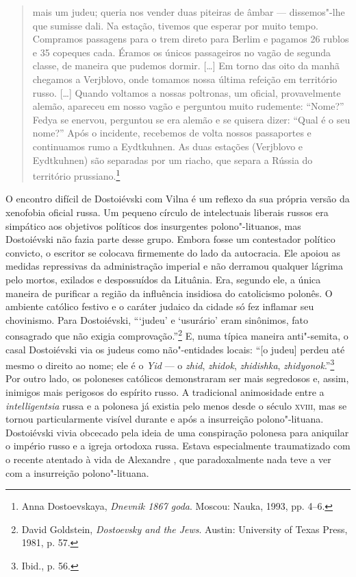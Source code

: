\begin{quote}
mais um judeu; queria nos vender duas piteiras de âmbar --- dissemos"-lhe
que sumisse dali. Na estação, tivemos que esperar por muito tempo.
Compramos passagens para o trem direto para Berlim e pagamos 26 rublos e
35 copeques cada. Éramos os únicos passageiros no vagão de segunda
classe, de maneira que pudemos dormir. [\ldots{}] Em torno das oito da
manhã chegamos a Verjblovo, onde tomamos nossa última refeição em
território russo. [\ldots{}] Quando voltamos a nossas poltronas, um
oficial, provavelmente alemão, apareceu em nosso vagão e perguntou muito
rudemente: ``Nome?'' Fedya se enervou, perguntou se era alemão e se
quisera dizer: ``Qual é o seu nome?'' Após o incidente, recebemos de
volta nossos passaportes e continuamos rumo a Eydtkuhnen. As duas
estações (Verjblovo e Eydtkuhnen) são separadas por um riacho, que
separa a Rússia do território prussiano.\footnote{Anna Dostoevskaya, \textit{Dnevnik 1867 goda}. Moscou: Nauka, 1993, pp. 4--6.} \end{quote}

O encontro difícil de Dostoiévski com Vilna é um reflexo da sua própria
versão da xenofobia oficial russa. Um pequeno círculo de intelectuais
liberais russos era simpático aos objetivos políticos dos insurgentes
polono"-lituanos, mas Dostoiévski não fazia parte desse grupo. Embora
fosse um contestador político convicto, o escritor se colocava
firmemente do lado da autocracia. Ele apoiou as medidas repressivas da
administração imperial e não derramou qualquer lágrima pelo mortos,
exilados e despossuídos da Lituânia. Era, segundo ele, a única maneira
de purificar a região da influência insidiosa do catolicismo polonês. O
ambiente católico festivo e o caráter judaico da cidade só fez inflamar
seu chovinismo. Para Dostoiévski, ```judeu' e `usurário' eram sinônimos,
fato consagrado que não exigia comprovação.''\footnote{David Goldstein, \textit{Dostoevsky and the Jews}. Austin: University of Texas Press, 1981, p. 57.} E, numa típica maneira anti"-semita, o casal Dostoiévski via os judeus como não"-entidades locais: ``{[}o judeu{]} perdeu até
mesmo o direito ao nome; ele é o \textit{Yid} --- o \textit{zhid}, \textit{zhidok},
\textit{zhidishka}, \textit{zhidyonok}.''\footnote{Ibid., p. 56.} Por outro
lado, os poloneses católicos demonstraram ser mais segredosos e, assim,
inimigos mais perigosos do espírito russo. A tradicional animosidade
entre a \textit{intelligentsia} russa e a polonesa já existia pelo menos
desde o século \textsc{xviii}, mas se tornou particularmente visível durante e após
a insurreição polono"-lituana. Dostoiévski vivia obcecado pela ideia de
uma conspiração polonesa para aniquilar o império russo e a igreja
ortodoxa russa. Estava especialmente traumatizado com o recente atentado
à vida de Alexandre , que paradoxalmente nada teve a ver com a
insurreição polono"-lituana.

